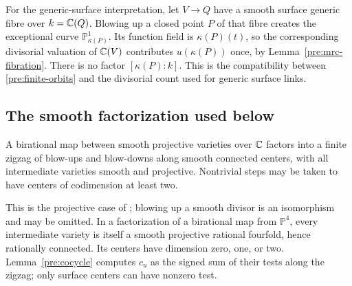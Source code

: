 For the generic-surface interpretation, let $V\to Q$ have a smooth
surface generic fibre over $k=\mathbb C(Q)$. Blowing up a closed point $P$ of
that fibre creates the exceptional curve $\mathbb P^1_{\kappa(P)}$.
Its function field is $\kappa(P)(t)$, so the corresponding divisorial
valuation of $\mathbb C(V)$ contributes $u(\kappa(P))$ once, by
Lemma~\ref{pre:mrc-fibration}. There is no factor $[\kappa(P):k]$.
This is the compatibility between \eqref{pre:finite-orbits} and the
divisorial count used for generic surface links.

\subsection{The smooth factorization used below}

\begin{theorem}\label{pre:weak-factorization}
A birational map between smooth projective varieties over $\mathbb C$ factors
into a finite zigzag of blow-ups and blow-downs along smooth connected
centers, with all intermediate varieties smooth and projective.
Nontrivial steps may be taken to have centers of codimension at least two.
\end{theorem}

This is the projective case of
\cite[Theorem~0.1.1]{AKMW02}; blowing up a smooth divisor is an
isomorphism and may be omitted. In a factorization of a birational map
from $\mathbb P^4$, every intermediate variety is itself a smooth
projective rational fourfold, hence rationally connected. Its centers
have dimension zero, one, or two. Lemma~\ref{pre:cocycle} computes
$c_u$ as the signed sum of their tests along the zigzag; only surface
centers can have nonzero test.
